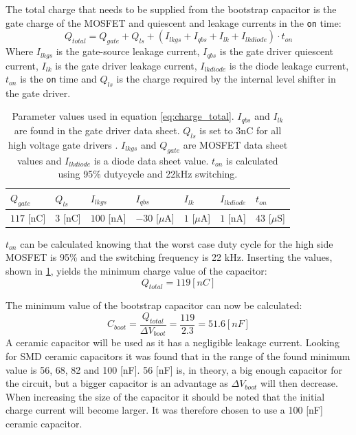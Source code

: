 The total charge that needs to be supplied from the bootstrap capacitor is the gate charge of the MOSFET and quiescent and leakage currents in the \texttt{on} time:
\begin{equation}
	Q_{total} = Q_{gate} + Q_{ls} + (I_{lkgs} + I_{qbs} + I_{lk} + I_{lkdiode}) \cdot t_{on}
	\label{eq:charge_total}
\end{equation}
Where $I_{lkgs}$ is the gate-source leakage current, $I_{qbs}$ is the gate driver quiescent current, $I_{lk}$ is the gate driver leakage current, $I_{lkdiode}$ is the diode leakage current, $ t_{on}$ is the \texttt{on} time and $Q_{ls}$ is the charge required by the internal level shifter in the gate driver.
\begin{table}[h]
\centering
\begin{tabular}{|l|l|l|l|l|l|l|}
 \hline
 $Q_{gate}$ 	& $Q_{ls}$ 	& $I_{lkgs}$ 	& $I_{qbs}$ 		& $I_{lk}$ 			& $I_{lkdiode}$ 	& $t_{on}$ 		\\ 	\hline
 $117$ [nC]		& $3$ [nC]	& $100$ [nA]	&$-30$ [$\mu$A]		& $1$ [$\mu$A]		& $1$ [nA]			& $43$ [$\mu$S]	\\ 	\hline
\end{tabular}
\caption[Parameter values used to determine total charge.]{Parameter values used in equation \ref{eq:charge_total}. $I_{qbs}$ and $I_{lk}$ are found in the gate driver data sheet. $Q_{ls}$ is set to 3nC for all high voltage gate drivers \cite{bootstrap_ON}. $I_{lkgs}$ and $Q_{gate}$ are MOSFET data sheet values and $I_{lkdiode}$  is a diode data sheet value. $t_{on}$ is calculated using 95\% dutycycle and 22kHz switching.}
\label{tab:bootstrap_parameter}
\end{table}
$t_{on}$ can be calculated knowing that the worst case duty cycle for the high side MOSFET is 95\% and the switching frequency is 22 kHz.
Inserting the values, shown in \ref{tab:bootstrap_parameter}, yields the minimum charge value of the capacitor:
\begin{equation}
	Q_{total} = 119 [nC]
\end{equation}

The minimum value of the bootstrap capacitor can now be calculated:
\begin{equation}
	C_{boot} = \frac{Q_{total}}{\Delta V_{boot}} = \frac{119}{2.3} = 51.6 [nF]
\end{equation}
A ceramic capacitor will be used as it has a negligible leakage current. 
Looking for SMD ceramic capacitors it was found that in the range of the found minimum value is 56, 68, 82 and 100 [nF].
56 [nF] is, in theory, a big enough capacitor for the circuit, but a bigger capacitor is an advantage as $\Delta V_{boot}$ will then decrease.
When increasing the size of the capacitor it should be noted that the initial charge current will become larger.
It was therefore chosen to use a 100 [nF] ceramic capacitor.

